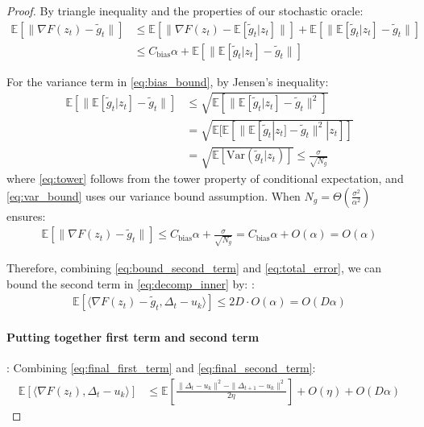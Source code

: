 \documentclass[letterpaper]{article} %
\newcommand{\1}{\mathbf{1}}
\begin{document}
\begin{proof}
By triangle inequality and the properties of our stochastic oracle:
\begin{align}
\mathbb{E}[\|\nabla F(z_t) - \tilde{g}_t\|] &\leq \mathbb{E}[\|\nabla F(z_t) - \mathbb{E}[\tilde{g}_t|z_t]\|] + \mathbb{E}[\|\mathbb{E}[\tilde{g}_t|z_t] - \tilde{g}_t\|] \label{eq:triangle}\\
&\leq C_{\text{bias}}\alpha + \mathbb{E}[\|\mathbb{E}[\tilde{g}_t|z_t] - \tilde{g}_t\|] \label{eq:bias_bound}
\end{align}

For the variance term in \eqref{eq:bias_bound}, by Jensen's inequality:
\begin{align}
\mathbb{E}[\|\mathbb{E}[\tilde{g}_t|z_t] - \tilde{g}_t\|] &\leq \sqrt{\mathbb{E}[\|\mathbb{E}[\tilde{g}_t|z_t] - \tilde{g}_t\|^2]} \label{eq:jensen}\\
&= \sqrt{\mathbb{E}[\mathbb{E}[\|\mathbb{E}[\tilde{g}_t|z_t] - \tilde{g}_t\|^2|z_t]]} \label{eq:tower}\\
&= \sqrt{\mathbb{E}[\text{Var}(\tilde{g}_t|z_t)]} \leq \frac{\sigma}{\sqrt{N_g}} \label{eq:var_bound}
\end{align}
where \eqref{eq:tower} follows from the tower property of conditional expectation, and \eqref{eq:var_bound} uses our variance bound assumption.
When $N_g = \Theta(\frac{\sigma^2}{\alpha^2})$ ensures:
\begin{align}
\mathbb{E}[\|\nabla F(z_t) - \tilde{g}_t\|] \leq C_{\text{bias}}\alpha + \frac{\sigma}{\sqrt{N_g}} = C_{\text{bias}}\alpha + O(\alpha) = O(\alpha) \label{eq:total_error}
\end{align}

Therefore, combining \eqref{eq:bound_second_term} and \eqref{eq:total_error}, we can bound the second term in \cref{eq:decomp_inner} by:
:
\begin{align}
\mathbb{E}[\langle \nabla F(z_t) - \tilde{g}_t, \Delta_t - u_k \rangle] \leq 2D \cdot O(\alpha) = O(D\alpha) \label{eq:final_second_term}
\end{align}


\paragraph{Putting together first term and second term}:
Combining \eqref{eq:final_first_term} and \eqref{eq:final_second_term}:
\begin{align}
\mathbb{E}[\langle \nabla F(z_t), \Delta_t - u_k \rangle] &\leq \mathbb{E}\left[\frac{\|\Delta_t - u_k\|^2 - \|\Delta_{t+1} - u_k\|^2}{2\eta}\right] + O(\eta) + O(D\alpha) \label{eq:combined_bound}
\end{align}


\end{proof}
\end{document}
